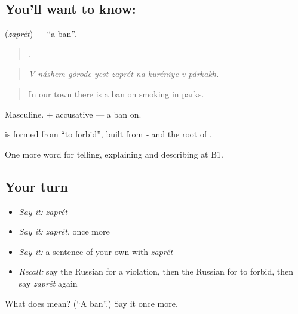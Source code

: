 \subsection*{You'll want to know: }
\textbf{} (\emph{zaprét}) — \textquotedblleft{}a ban\textquotedblright{}.

\begin{quote}
        .
\end{quote}

\begin{quote}
\emph{V náshem górode yest zaprét na kuréniye v párkakh.}
\end{quote}

\begin{quote}
In our town there is a ban on smoking in parks.
\end{quote}

Masculine. \emph{ } + accusative — a ban on.

\begin{cousinweb}
\textbf{} is formed from \emph{} \textquotedblleft{}to forbid\textquotedblright{}, built from \emph{-} and the root of \emph{}.
\end{cousinweb}

\begin{grammarlens}[title={What you've built}]
One more word for telling, explaining and describing at B1.
\end{grammarlens}

\subsection*{Your turn}
\begin{itemize}
\raggedright
  \item \emph{Say it:} \emph{zaprét}
  \item \emph{Say it:} \emph{zaprét}, once more
  \item \emph{Say it:} a sentence of your own with \emph{zaprét}
  \item \emph{Recall:} say the Russian for a violation, then the Russian for to forbid, then say \emph{zaprét} again
\end{itemize}

\begin{tcolorbox}[breakable,colback=teal!4,colframe=teal!35!black,title={Before you move on}]
What does  mean? (\textquotedblleft{}A ban\textquotedblright{}.) Say it once more.
\end{tcolorbox}
